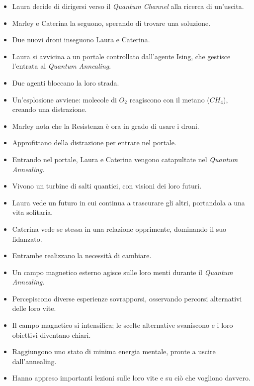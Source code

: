 \begin{itemize}
\begin{itemize}
    \item Laura decide di dirigersi verso il \emph{Quantum Channel} alla ricerca di un'uscita.
    \item Marley e Caterina la seguono, sperando di trovare una soluzione.
\end{itemize}



\begin{itemize}
    \item Due nuovi droni inseguono Laura e Caterina.
    \item Laura si avvicina a un portale controllato dall'agente Ising, che gestisce l'entrata al \emph{Quantum Annealing}.
    \item Due agenti bloccano la loro strada.
    \item Un'esplosione avviene: molecole di \( O_2 \) reagiscono con il metano (\( CH_4 \)), creando una distrazione.
    \item Marley nota che la Resistenza è ora in grado di usare i droni.
    \item Approfittano della distrazione per entrare nel portale.
\end{itemize}



\begin{itemize}
    \item Entrando nel portale, Laura e Caterina vengono catapultate nel \emph{Quantum Annealing}.
    \item Vivono un turbine di salti quantici, con visioni dei loro futuri.
    \item Laura vede un futuro in cui continua a trascurare gli altri, portandola a una vita solitaria.
    \item Caterina vede se stessa in una relazione opprimente, dominando il suo fidanzato.
    \item Entrambe realizzano la necessità di cambiare.
\end{itemize}



\begin{itemize}
    \item Un campo magnetico esterno agisce sulle loro menti durante il \emph{Quantum Annealing}.
    \item Percepiscono diverse esperienze sovrapporsi, osservando percorsi alternativi delle loro vite.
    \item Il campo magnetico si intensifica; le scelte alternative svaniscono e i loro obiettivi diventano chiari.
    \item Raggiungono uno stato di minima energia mentale, pronte a uscire dall'annealing.
    \item Hanno appreso importanti lezioni sulle loro vite e su ciò che vogliono davvero.
\end{itemize}
\end{itemize}
